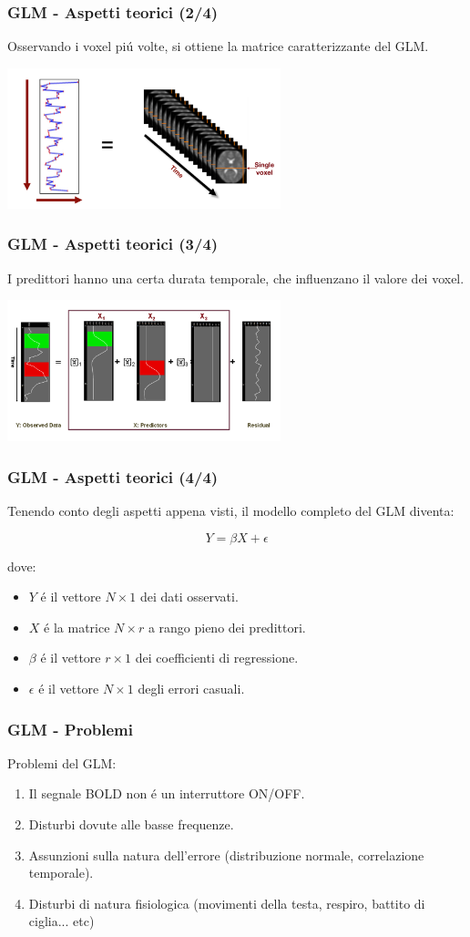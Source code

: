 \documentclass{beamer}
\begin{document}
\begin{frame}
\frametitle{GLM - Aspetti teorici (2/4)}
Osservando i voxel pi\'u  volte, si ottiene la \alert{matrice caratterizzante} del GLM.

\includegraphics[keepaspectratio, width = 300px	]{Images/glm_matrix.png}
\end{frame}

\begin{frame}
\frametitle{GLM - Aspetti teorici (3/4)}
I predittori hanno una certa durata temporale, che influenzano il valore dei voxel.

\includegraphics[keepaspectratio, width = 300px]{Images/glm_visual.png}
\end{frame}

\begin{frame}
\frametitle{GLM - Aspetti teorici (4/4)}
Tenendo conto degli aspetti appena visti, il modello completo del GLM diventa:

$$Y = \beta X + \epsilon$$

dove:
\begin{itemize}
\item $Y$ \'e il vettore $N \times 1 $ dei dati osservati.
\item $X$ \'e la matrice $N \times r$ a rango pieno dei predittori.
\item $\beta$ \'e il vettore $r \times 1$ dei coefficienti di regressione.
\item $\epsilon$ \'e il vettore $N \times 1$ degli errori casuali.
\end{itemize}
\end{frame}

\begin{frame}
\frametitle{GLM - Problemi}
Problemi del GLM:
\begin{enumerate}
\item Il segnale BOLD non \'e un interruttore ON/OFF.
\item Disturbi dovute alle basse frequenze.
\item Assunzioni sulla natura dell'errore (distribuzione normale, correlazione temporale).
\item Disturbi di natura fisiologica (movimenti della testa, respiro, battito di ciglia... etc)
\end{enumerate}
\end{frame}
\end{document}
